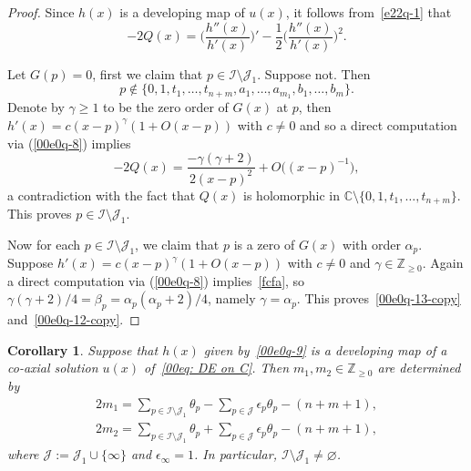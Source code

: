 \documentclass[pdftex]{sigma}
\numberwithin{equation}{section}
\newtheorem{Corollary}[Theorem]{Corollary}
\def\C{\mathbb C}
\begin{document}
\begin{proof} Since $h(x)$ is a developing map of $u(x)$, it follows from~\eqref{e22q-1} that
\begin{equation}
\label{00e0q-8}-2Q(x)=\biggl(\frac{h''(x)}{h'(x)}\biggr)'-\frac12 \biggl(\frac{h''(x)}{h'(x)}\biggr)^2.
\end{equation}

Let $G(p)=0$, first we claim that $p\in\mathcal{I}\setminus \mathcal{J}_1$.
Suppose not. Then
\[
 p\notin\{0,1,t_1,\dots,t_{n+m}, a_1,\dots, a_{m_1}, b_1,\dots,
 b_m\}.
\]
Denote by $\gamma\geq 1$ to be the zero order of $G(x)$ at $p$, then $h'(x)=c(x-p)^\gamma(1+O(x-p))$ with $c\neq 0$ and so a direct computation via (\ref{00e0q-8}) implies
\begin{equation}\label{fcfa}-2Q(x)=\frac{-\gamma (\gamma+2)}{2(x-p)^2}+O\bigl((x-p)^{-1}\bigr),\end{equation}
a contradiction with the fact that $Q(x)$ is holomorphic in $\C\setminus\{0,1,t_1,\dots, t_{n+m}\}$. This proves $p\in\mathcal{I}\setminus \mathcal{J}_1$.

Now for each $p\in\mathcal{I}\setminus \mathcal{J}_1$,
we claim that $p$ is a zero of $G(x)$ with order $\alpha_{p}$.
Suppose $h'(x)=c(x-p)^\gamma(1+O(x-p))$ with $c\neq 0$ and
$\gamma\in\mathbb{Z}_{\geq 0}$. Again a direct computation via
(\ref{00e0q-8}) implies~\eqref{fcfa},
so $\gamma(\gamma+2)/4=\beta_{p}=\alpha_{p}(\alpha_{p}+2)/4$, namely
$\gamma=\alpha_{p}$. %
This proves~\eqref{00e0q-13-copy} and~\eqref{00e0q-12-copy}.
\end{proof}

\begin{Corollary}%
Suppose that $h(x)$ given by~\eqref{00e0q-9} is a developing map of a
co-axial solution $u(x)$ of~\eqref{00eq: DE on C}. Then $m_1,
m_2\in\mathbb{Z}_{\geq 0}$ are determined by
\begin{gather}\label{m1}
2m_1=\sum_{p\in\mathcal{I}\setminus \mathcal{J}_1}\theta_p-\sum_{p\in\mathcal{J}}\epsilon_p\theta_p-(n+m+1),
\\ \label{m2}
2m_2=\sum_{p\in\mathcal{I}\setminus \mathcal{J}_1}\theta_p+\sum_{p\in\mathcal{J}}\epsilon_p\theta_p-(n+m+1),
\end{gather}
where $\mathcal{J}:=\mathcal{J}_1\cup\{\infty\}$ and $\epsilon_\infty=1$. In particular, $\mathcal{I}\setminus\mathcal{J}_1\neq \varnothing$.
\end{Corollary}
\end{document}

